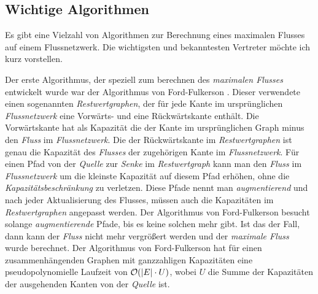 \begin{center}
\end{center}

\subsection{Wichtige Algorithmen}

Es gibt eine Vielzahl von Algorithmen zur Berechnung eines maximalen Flusses auf einem Flussnetzwerk. Die wichtigsten und bekanntesten Vertreter möchte ich kurz vorstellen. 

Der erste Algorithmus, der speziell zum berechnen des \emph{maximalen Flusses} entwickelt wurde war der Algorithmus von Ford-Fulkerson \citep{gt14}. Dieser verwendete einen sogenannten \emph{Restwertgraphen}, der für jede Kante im ursprünglichen \emph{Flussnetzwerk} eine Vorwärts- und eine Rückwärtskante enthält. Die Vorwärtskante hat als Kapazität die der Kante im ursprünglichen Graph minus den \emph{Fluss} im \emph{Flussnetzwerk}. Die der Rückwärtskante im \emph{Restwertgraphen} ist genau die Kapazität des \emph{Flusses} der zugehörigen Kante im \emph{Flussnetzwerk}. Für einen Pfad von der \emph{Quelle} zur \emph{Senke} im \emph{Restwertgraph} kann man den \emph{Fluss} im \emph{Flussnetzwerk} um die kleinste Kapazität auf diesem Pfad erhöhen, ohne die \emph{Kapazitätsbeschränkung} zu verletzen. Diese Pfade nennt man \emph{augmentierend} und nach jeder Aktualisierung des Flusses, müssen auch die Kapazitäten im \emph{Restwertgraphen} angepasst werden. Der Algorithmus von Ford-Fulkerson besucht solange \emph{augmentierende} Pfade, bis es keine solchen mehr gibt. Ist das der Fall, dann kann der \emph{Fluss} nicht mehr vergrößert werden und der \emph{maximale Fluss} wurde berechnet. Der Algorithmus von Ford-Fulkerson hat für einen zusammenhängenden Graphen mit ganzzahligen Kapazitäten eine pseudopolynomielle Laufzeit von $\mathcal{O}(|E|\cdot U)$, wobei $U$ die Summe der Kapazitäten der ausgehenden Kanten von der \emph{Quelle} ist.

